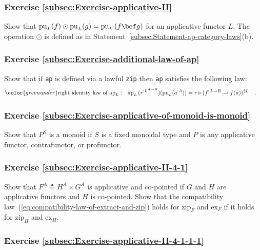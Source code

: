 \subsubsection{Exercise \label{subsec:Exercise-applicative-II}\ref{subsec:Exercise-applicative-II}}

Show that $\text{pu}_{L}(f)\odot\text{pu}_{L}(g)=\text{pu}_{L}\left(f\bef g\right)$
for an applicative functor $L$. The operation $\odot$ is defined
as in Statement~\ref{subsec:Statement-ap-category-laws}(b).

\subsubsection{Exercise \label{subsec:Exercise-additional-law-of-ap}\ref{subsec:Exercise-additional-law-of-ap}}

Show that if \lstinline!ap! is defined via a lawful \lstinline!zip!
then \lstinline!ap! satisfies the following law:
\begin{align*}
{\color{greenunder}\text{right identity law of }\text{ap}_{L}:}\quad & \text{ap}_{L}\,(r^{:L^{A\rightarrow B}})(\text{pu}_{L}(a^{:A}))=r\triangleright(f^{:A\rightarrow B}\rightarrow f(a))^{\uparrow L}\quad.
\end{align*}


\subsubsection{Exercise \label{subsec:Exercise-applicative-of-monoid-is-monoid}\ref{subsec:Exercise-applicative-of-monoid-is-monoid}}

Show that $P^{S}$ is a monoid if $S$ is a fixed monoidal type and
$P$ is any applicative functor, contrafunctor, or profunctor.

\subsubsection{Exercise \label{subsec:Exercise-applicative-II-4-1}\ref{subsec:Exercise-applicative-II-4-1}}

Show that $F^{A}\triangleq H^{A}\times G^{A}$ is applicative and
co-pointed if $G$ and $H$ are applicative functors and $H$ is co-pointed.
Show that the compatibility law~(\ref{eq:compatibility-law-of-extract-and-zip})
holds for $\text{zip}_{F}$ and $\text{ex}_{F}$ if it holds for $\text{zip}_{H}$
and $\text{ex}_{H}$.

\subsubsection{Exercise \label{subsec:Exercise-applicative-II-4-1-1-1}\ref{subsec:Exercise-applicative-II-4-1-1-1}}

